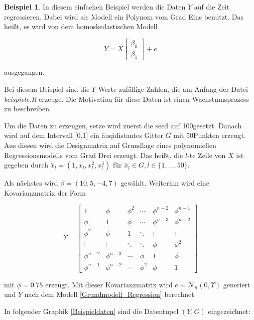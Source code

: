 \documentclass[12pt,a4paper]{article}
\theoremstyle{definition}
\newtheorem{Beispiel}[Definition]{Beispiel}
\theoremstyle{definition}
\theoremstyle{definition}
\theoremstyle{definition}
\newcommand{\seedexample}{100}
\newcommand{\nobs}{50}
\newcommand{\betatrue}{(10,5,-4,7)}
\newcommand{\phitrue}{0.75}
\newcommand{\betaone}[0]{\left[ \begin{array}{c} \beta_{0} \\ \beta_{1} \end{array} \right]}
\begin{document}

\begin{Beispiel}
In diesem einfachen Beispiel werden die Daten $Y$ auf die Zeit regressieren. Dabei wird als Modell ein Polynom vom Grad Eins benutzt. Das heißt, es wird von dem homoskedastischen Modell

\begin{equation*}
Y =  X  \betaone + e 
\end{equation*}

ausgegangen.

Bei diesem Beispiel sind die $Y$-Werte zufällige Zahlen, die am Anfang der Datei \textit{beispiele.R} erzeuge. Die Motivation für diese Daten ist einen Wachstumsprozess zu beschreiben.

Um die Daten zu erzeugen, setze wird zuerst die seed auf \seedexample gesetzt. Danach wird  auf dem Intervall [0,1] ein äuqidistantes Gitter $G$ mit \nobs  Punkten erzeugt. Aus diesen wird die Designmatrix auf Grundlage eines polynomiellen Regressionsmodells vom Grad Drei erzeugt. Das heißt, die $l$-te Zeile von $X$ ist gegeben durch $\tilde{x_l} = (1, x_l, x_l^2, x_l^3)$ für $\tilde{x_l} \in G, l \in \{1, \ldots, \nobs\}$.

Als nächstes wird $\beta = \betatrue$ gewählt. Weiterhin wird eine Kovarianzmatrix der Form 

\[
\Upsilon = 
\left[
   \begin{array}{cccccc}
     1 				& \phi 			& \phi^2	& \cdots	& \phi^{n-2}	& \phi^{n-1} 	\\
     \phi 			& 1		 		& \phi 		& \cdots	& \phi^{n-3}	& \phi^{n-2} 	\\
     \phi^2 		& \phi 			& 1		 	& \ddots	& \vdots		& \vdots 		\\
     \vdots		 	& \vdots	 	& \ddots	& \ddots	& \phi			& \phi^{2} 	\\
     \phi^{n-2} 	& \phi^{n-3}	& \cdots 	& \phi		& 1				& \phi 		\\
     \phi^{n-1} 	& \phi^{n-2} 	& \cdots	& \phi^{2}	& \phi			& 1  
   \end{array}
\right]
\]

mit $\phi = \phitrue$ erzeugt. Mit dieser Kovarianzmatrix wird $e \sim \mathscr{N}_{n}(0,\Upsilon)$ generiert und  $Y$ nach dem Modell \eqref{Grundmodell_Regression} berechnet.

In folgender Graphik \ref{Beispieldaten} sind die Datentupel $(Y,G)$ eingezeichnet:


\end{Beispiel}
\end{document}
